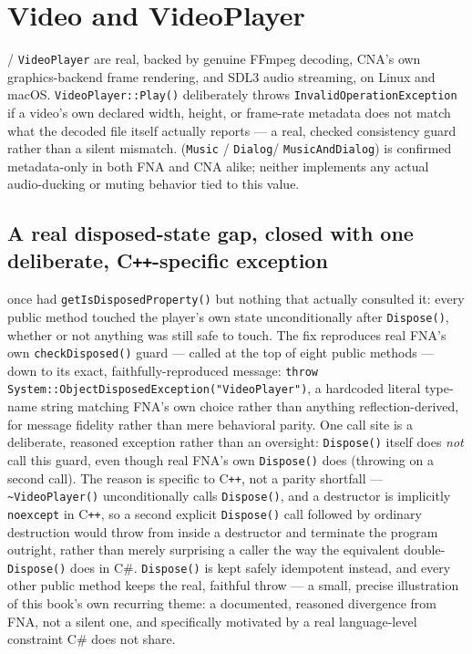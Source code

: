 \section{Video and VideoPlayer}

 / \texttt{VideoPlayer} are real, backed by genuine FFmpeg decoding, CNA's own
graphics-backend frame rendering, and SDL3 audio streaming, on Linux and macOS.
\texttt{VideoPlayer::Play()} deliberately throws \texttt{InvalidOperationException} if a
video's own declared width, height, or frame-rate metadata does not match what the decoded
file itself actually reports --- a real, checked consistency guard rather than a silent
mismatch.  (\texttt{Music} / \texttt{Dialog}/%
\texttt{MusicAndDialog}) is confirmed metadata-only in both FNA and CNA alike; neither
implements any actual audio-ducking or muting behavior tied to this value.

\subsection{A real disposed-state gap, closed with one deliberate, C\texttt{++}-specific exception}

 once had \texttt{getIsDisposedProperty()} but nothing that actually
consulted it: every public method touched the player's own state unconditionally after
\texttt{Dispose()}, whether or not anything was still safe to touch. The fix reproduces real
FNA's own \texttt{checkDisposed()} guard --- called at the top of eight public methods --- down
to its exact, faithfully-reproduced message: \texttt{throw
System::ObjectDisposedException("VideoPlayer")}, a hardcoded literal type-name string matching
FNA's own choice rather than anything reflection-derived, for message fidelity rather than mere
behavioral parity. One call site is a deliberate, reasoned exception rather than an oversight:
\texttt{Dispose()} itself does \emph{not} call this guard, even though real FNA's own
\texttt{Dispose()} does (throwing on a second call). The reason is specific to C\texttt{++}, not
a parity shortfall --- \texttt{\textasciitilde VideoPlayer()} unconditionally calls
\texttt{Dispose()}, and a destructor is implicitly \texttt{noexcept} in C\texttt{++}, so a second
explicit \texttt{Dispose()} call followed by ordinary destruction would throw from inside a
destructor and terminate the program outright, rather than merely surprising a caller the way
the equivalent double-\texttt{Dispose()} does in C\#. \texttt{Dispose()} is kept safely
idempotent instead, and every other public method keeps the real, faithful throw --- a small,
precise illustration of this book's own recurring theme: a documented, reasoned divergence from
FNA, not a silent one, and specifically motivated by a real language-level constraint C\# does
not share.

